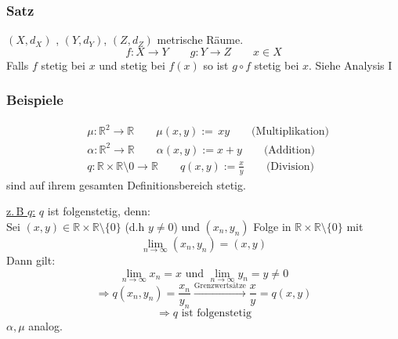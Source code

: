 \subsubsection{Satz} %
\label{ssub:satz}
$(X,d_X)$ , $(Y,d_Y)$, $(Z,d_Z)$ metrische Räume. 
\[ f:X \to Y \qquad g:Y \to Z \qquad x \in X \]
Falls $f$ stetig bei $x$ und stetig bei $f(x)$ so ist $g \circ f$ stetig bei $x$.
 Siehe Analysis I 
\subsubsection{Beispiele} %
\label{ssub:beispiele}
\begin{align*}
&\mu: \mathbb{R}^2 \to \mathbb{R} \qquad \mu(x,y):= \, xy \qquad \text{(Multiplikation)} \\
&\alpha: \mathbb{R}^2 \to \mathbb{R} \qquad \alpha(x,y):=x+y \qquad \text{(Addition)}  \\
&q:\mathbb{R} \times \mathbb{R} \setminus {0} \to \mathbb{R} \qquad q(x,y):= \frac{x}{y} \qquad \text{(Division)}
\end{align*}
sind auf ihrem gesamten Definitionsbereich stetig.

\underline{z.\,B $q$:}
$q$ ist folgenstetig, denn: \\
Sei $(x,y) \in \mathbb{R} \times \mathbb{R} \setminus \{0\}$ (d.h $y \neq 0$) und $(x_n,y_n)$ Folge in $\mathbb{R} \times \mathbb{R} \setminus \{0\}$ mit 
\[
	\lim_{n \to \infty}(x_n,y_n)=(x,y)
\]
Dann gilt: 
\[
	\lim_{n \to \infty}x_n=x \text{ und } \lim_{n \to \infty}y_n=y \neq 0
\]
\[
	\Rightarrow q(x_n,y_n)= \frac{x_n}{y_n} \stackrel{\text{Grenzwertsätze}}{\longrightarrow } \frac{x}{y} = q(x,y)
\]
\[
	\Rightarrow q \text{ ist folgenstetig}
\]
$\alpha, \mu$ analog.
\bewende

